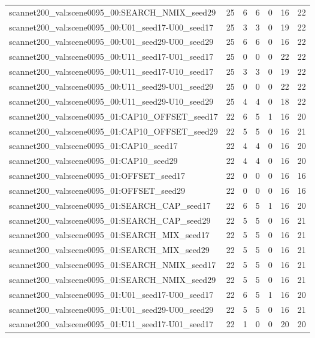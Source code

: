 \begin{table}[t]
\begin{tabular}{lrrrrrr}
scannet200\_val:scene0095\_00:SEARCH\_NMIX\_seed29 & 25 & 6 & 6 & 0 & 16 & 22 \\
scannet200\_val:scene0095\_00:U01\_seed17-U00\_seed17 & 25 & 3 & 3 & 0 & 19 & 22 \\
scannet200\_val:scene0095\_00:U01\_seed29-U00\_seed29 & 25 & 6 & 6 & 0 & 16 & 22 \\
scannet200\_val:scene0095\_00:U11\_seed17-U01\_seed17 & 25 & 0 & 0 & 0 & 22 & 22 \\
scannet200\_val:scene0095\_00:U11\_seed17-U10\_seed17 & 25 & 3 & 3 & 0 & 19 & 22 \\
scannet200\_val:scene0095\_00:U11\_seed29-U01\_seed29 & 25 & 0 & 0 & 0 & 22 & 22 \\
scannet200\_val:scene0095\_00:U11\_seed29-U10\_seed29 & 25 & 4 & 4 & 0 & 18 & 22 \\
scannet200\_val:scene0095\_01:CAP10\_OFFSET\_seed17 & 22 & 6 & 5 & 1 & 16 & 20 \\
scannet200\_val:scene0095\_01:CAP10\_OFFSET\_seed29 & 22 & 5 & 5 & 0 & 16 & 21 \\
scannet200\_val:scene0095\_01:CAP10\_seed17 & 22 & 4 & 4 & 0 & 16 & 20 \\
scannet200\_val:scene0095\_01:CAP10\_seed29 & 22 & 4 & 4 & 0 & 16 & 20 \\
scannet200\_val:scene0095\_01:OFFSET\_seed17 & 22 & 0 & 0 & 0 & 16 & 16 \\
scannet200\_val:scene0095\_01:OFFSET\_seed29 & 22 & 0 & 0 & 0 & 16 & 16 \\
scannet200\_val:scene0095\_01:SEARCH\_CAP\_seed17 & 22 & 6 & 5 & 1 & 16 & 20 \\
scannet200\_val:scene0095\_01:SEARCH\_CAP\_seed29 & 22 & 5 & 5 & 0 & 16 & 21 \\
scannet200\_val:scene0095\_01:SEARCH\_MIX\_seed17 & 22 & 5 & 5 & 0 & 16 & 21 \\
scannet200\_val:scene0095\_01:SEARCH\_MIX\_seed29 & 22 & 5 & 5 & 0 & 16 & 21 \\
scannet200\_val:scene0095\_01:SEARCH\_NMIX\_seed17 & 22 & 5 & 5 & 0 & 16 & 21 \\
scannet200\_val:scene0095\_01:SEARCH\_NMIX\_seed29 & 22 & 5 & 5 & 0 & 16 & 21 \\
scannet200\_val:scene0095\_01:U01\_seed17-U00\_seed17 & 22 & 6 & 5 & 1 & 16 & 20 \\
scannet200\_val:scene0095\_01:U01\_seed29-U00\_seed29 & 22 & 5 & 5 & 0 & 16 & 21 \\
scannet200\_val:scene0095\_01:U11\_seed17-U01\_seed17 & 22 & 1 & 0 & 0 & 20 & 20 \\

\end{tabular}
\end{table}
